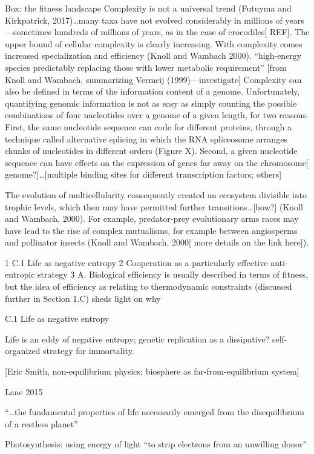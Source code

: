 \documentclass{tufte-book} %
\begin{document}
Box: the fitness landscape
Complexity is not a universal trend (Futuyma and Kirkpatrick, 2017)…many taxa have not evolved considerably in millions of years—sometimes hundreds of millions of years, as in the case of crocodiles[ REF].
The upper bound of cellular complexity is clearly increasing. With complexity comes increased specialization and efficiency (Knoll and Wambach 2000). 
“high-energy species predictably replacing those with lower metabolic requirement” [from Knoll and Wambach, summarizing Vermeij (1999)—investigate]
Complexity can also be defined in terms of the information content of a genome. Unfortunately, quantifying genomic information is not as easy as simply counting the possible combinations of four nucleotides over a genome of a given length, for two reasons. First, the same nucleotide sequence can code for different proteins, through a technique called alternative splicing in which the RNA spliceosome arranges chunks of nucleotides in different orders (Figure X). Second, a given nucleotide sequence can have effects on the expression of genes far away on the chromosome[ genome?]…[multiple binding sites for different transcription factors; others]

The evolution of multicellularity consequently created an ecosystem divisible into trophic levels, which then may have permitted further transitions…[how?] (Knoll and Wambach, 2000). For example, predator-prey evolutionary arms races may have lead to the rise of complex mutualisms, for example between angiosperms and pollinator insects (Knoll and Wambach, 2000[ more details on the link here]). 


	1	C.1	Life as negative entropy
	2	Cooperation as a particularly effective anti-entropic strategy 
	3	
	A.	Biological efficiency is usually described in terms of fitness, but the idea of efficiency as relating to thermodynamic constraints (discussed further in Section 1.C) sheds light on why

C.1 Life as negative entropy

Life is an eddy of negative entropy; genetic replication as a dissipative? self-organized strategy for immortality.

[Eric Smith, non-equilibrium physics; biosphere as far-from-equilibrium system]

Lane 2015

“…the fundamental properties of life necessarily emerged from the disequilibrium of a restless planet”

Photosynthesis: using energy of light “to strip electrons from an unwilling donor”
\end{document}
